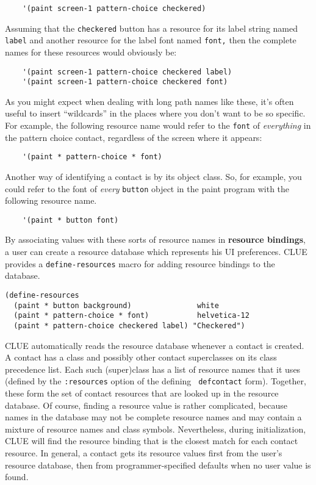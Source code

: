 \begin{verbatim}
    '(paint screen-1 pattern-choice checkered)
\end{verbatim}

Assuming that the {\tt checkered} button has a resource for its label
string named {\tt label} and another resource for the label font named
{\tt font,}
then the complete names for these resources would obviously be:


\begin{verbatim}
    '(paint screen-1 pattern-choice checkered label)
    '(paint screen-1 pattern-choice checkered font)
\end{verbatim}

As you might expect when dealing with long path names like these, it's
often useful to insert ``wildcards'' in the places where you don't want
to be so specific. For example, the following resource name would refer to
the {\tt font} of {\em everything} in the pattern choice contact, regardless of
the screen where it appears:

\begin{verbatim}
    '(paint * pattern-choice * font)
\end{verbatim}

Another way of identifying a contact is by its object class. So, for
example, you could refer to the font of {\em every} {\tt button} object in the
paint program with the following resource name.

\begin{verbatim}
    '(paint * button font)
\end{verbatim}

By associating values with these sorts of resource names in {\bf
resource bindings}, a user can
create a resource database which represents his UI preferences.
CLUE provides a {\tt define-resources} macro for adding
resource bindings to the database.
\begin{verbatim}
(define-resources
  (paint * button background)               white
  (paint * pattern-choice * font)           helvetica-12
  (paint * pattern-choice checkered label) "Checkered")
\end{verbatim}

CLUE automatically reads the resource database whenever a contact is
created. A contact has a class and possibly other contact superclasses
on its class precedence list. Each such
(super)class has a list of resource names that it uses (defined by the
{\tt :resources} option of the defining {\tt
defcontact}
form). Together, these form the set of contact resources that are looked
up in the resource database. Of course, finding a resource value is rather complicated,
because names in the database may not be complete resource
names and may contain a mixture of resource names and class symbols.
Nevertheless, during initialization,
CLUE will find the resource binding that is the closest match for each
contact resource. In general, a contact gets its resource values  first
from the user's resource database, then from programmer-specified
defaults when no user value is found.


